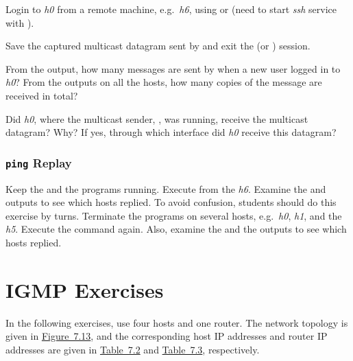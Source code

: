 \documentclass{../UTNetLab}
\begin{document}
    Login to \textit{h0} from a remote machine, e.g.\ \textit{h6}, using  or  (need to start \textit{ssh} service with ).

    Save the captured multicast datagram sent by  and exit the  (or ) session.

    \begin{report}
        \item From the  output, how many messages are sent by  when a new user logged in to \textit{h0}?
            From the  outputs on all the hosts, how many copies of the message are received in total?

        \item Did \textit{h0}, where the multicast sender, , was running, receive the multicast datagram?
            Why?
            If yes, through which interface did \textit{h0} receive this datagram?
    \end{report}

\section{\texttt{ping} Replay}
    Keep the  and the  programs running.
    Execute  from the \textit{h6}.
    Examine the  and  outputs to see which hosts replied.
    To avoid confusion, students should do this exercise by turns.
    Terminate the  programs on several hosts, e.g.\ \textit{h0}, \textit{h1}, and the \textit{h5}.
    Execute the  command again.
    Also, examine the  and the  outputs to see which hosts replied.

\part{IGMP Exercises}\label{sec:igmp}
    In the following exercises, use four hosts and one router.
    The network topology is given in \hyperref[fig:7.13]{Figure~7.13}, and the corresponding host IP addresses and router IP addresses are given in \hyperref[tab:7.2]{Table~7.2} and \hyperref[tab:7.3]{Table~7.3}, respectively.
\end{document}
